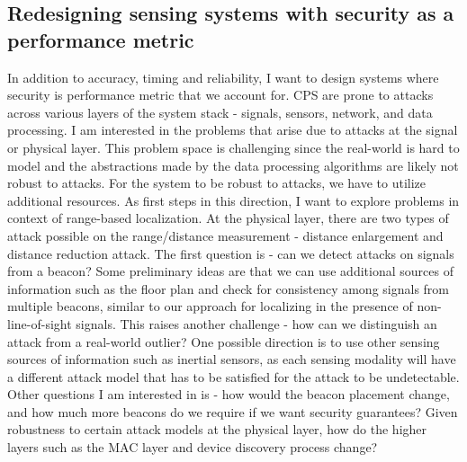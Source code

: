 \documentclass[10pt]{article}
\begin{document}
\subsection{Redesigning sensing systems with security as a performance metric}
In addition to accuracy, timing and reliability, I want to design systems where security is performance metric that we account for. CPS are prone to attacks across various layers of the system stack - signals, sensors, network, and data processing. I am interested in the problems that arise due to attacks at the signal or physical layer. This problem space is challenging since the real-world is hard to model and the abstractions made by the data processing algorithms are likely not robust to attacks. For the system to be robust to attacks, we have to utilize additional resources. %
As first steps in this direction, I want to explore problems in context of range-based localization. At the physical layer, there are two types of attack possible on the range/distance measurement - distance enlargement and distance reduction attack. The first question is - can we detect attacks on signals from a beacon? Some preliminary ideas are that we can use additional sources of information  such as the floor plan and check for consistency among signals from multiple beacons, similar to our approach for localizing in the presence of non-line-of-sight signals. This raises another challenge - how can we distinguish an attack from a real-world outlier? One possible direction is to use other sensing sources of information such as inertial sensors, as each sensing modality will have a different attack model that has to be satisfied for the attack to be undetectable. %
Other questions I am interested in is - how would the beacon placement change, and how much more beacons do we require if we want security guarantees? Given robustness to certain attack models at the physical layer, how do the higher layers such as the MAC layer and device discovery process change? %
\end{document}
